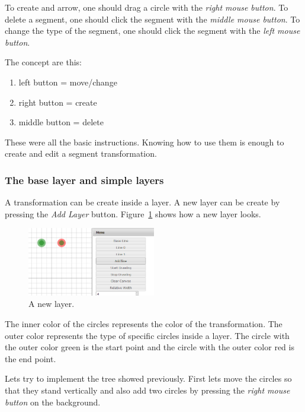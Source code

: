             To create and arrow, one should drag a circle with the \emph{right mouse button}.
            To delete a segment, one should click the segment with the \emph{middle mouse button}.
            To change the type of the segment, one should click the segment with the \emph{left mouse button}.

            The concept are this: 
            \begin{enumerate}
                \item left button = move/change
                \item right button = create
                \item middle button = delete
            \end{enumerate}
            These were all the basic instructions. 
            Knowing how to use them is enough to create and edit a segment transformation.

        \subsubsection{The base layer and simple layers}

            A transformation can be create inside a layer. 
            A new layer can be create by pressing the \emph{Add Layer} button.
            Figure~\ref{gui01} shows how a new layer looks.

            \begin{figure}[ht]
                \caption{\label{gui01} A new layer.}
                \centering
                \includegraphics[width=0.5\textwidth]{img/gui01.png}
            \end{figure}

            The inner color of the circles represents the color of the transformation.
            The outer color represents the type of specific circles inside a layer.
            The circle with the outer color green is the start point and the circle with the outer color red is the end point.

            Lets try to implement the tree showed previously.
            First lets move the circles so that they stand vertically and also add two circles by pressing the \emph{right mouse button} on the background.

